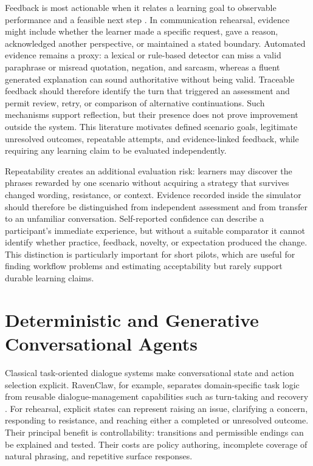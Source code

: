 Feedback is most actionable when it relates a learning goal to observable performance and a feasible next step \cite{hattie2007feedback}. In communication rehearsal, evidence might include whether the learner made a specific request, gave a reason, acknowledged another perspective, or maintained a stated boundary. Automated evidence remains a proxy: a lexical or rule-based detector can miss a valid paraphrase or misread quotation, negation, and sarcasm, whereas a fluent generated explanation can sound authoritative without being valid. Traceable feedback should therefore identify the turn that triggered an assessment and permit review, retry, or comparison of alternative continuations. Such mechanisms support reflection, but their presence does not prove improvement outside the system. This literature motivates defined scenario goals, legitimate unresolved outcomes, repeatable attempts, and evidence-linked feedback, while requiring any learning claim to be evaluated independently.

Repeatability creates an additional evaluation risk: learners may discover the phrases rewarded by one scenario without acquiring a strategy that survives changed wording, resistance, or context. Evidence recorded inside the simulator should therefore be distinguished from independent assessment and from transfer to an unfamiliar conversation. Self-reported confidence can describe a participant's immediate experience, but without a suitable comparator it cannot identify whether practice, feedback, novelty, or expectation produced the change. This distinction is particularly important for short pilots, which are useful for finding workflow problems and estimating acceptability but rarely support durable learning claims.

\section{Deterministic and Generative Conversational Agents}
\label{sec:sota-dialogue}
\label{sec:sota-affective-dialogue}

Classical task-oriented dialogue systems make conversational state and action selection explicit. RavenClaw, for example, separates domain-specific task logic from reusable dialogue-management capabilities such as turn-taking and recovery \cite{bohus2009ravenclaw}. For rehearsal, explicit states can represent raising an issue, clarifying a concern, responding to resistance, and reaching either a completed or unresolved outcome. Their principal benefit is controllability: transitions and permissible endings can be explained and tested. Their costs are policy authoring, incomplete coverage of natural phrasing, and repetitive surface responses.

